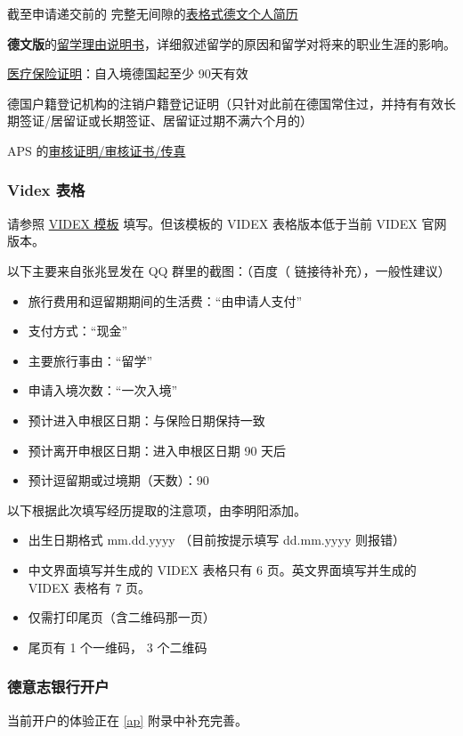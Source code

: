 \documentclass{article}
\begin{document}
\begin{enumerate}
\item 截至申请递交前的
完整无间隙的\underline{表格式德文个人简历}
\item \textbf{德文版}的\underline{留学理由说明书}，详细叙述留学的原因和留学对将来的职业生涯的影响。
\item \underline{医疗保险证明}：自入境德国起至少 90天有效
{\color{gray}\item 德国户籍登记机构的注销户籍登记证明（只针对此前在德国常住过，并持有有效长期签证/居留证或长期签证、居留证过期不满六个月的）}
\item APS 的\underline{审核证明/审核证书/传真}
\end{enumerate}

\subsubsection{Videx 表格}
请参照 \href{https://www.aps.org.cn/wp-content/uploads/Beispiel-Videx.pdf}{VIDEX 模板} 填写。但该模板的 VIDEX 表格版本低于当前 VIDEX 官网版本。

以下主要来自张兆昱发在 QQ 群里的截图：（百度（%
链接待补充），一般性建议）
\begin{itemize}
\item 旅行费用和逗留期期间的生活费：“由申请人支付”
\item 支付方式：“现金”
\item 主要旅行事由：“留学”
\item 申请入境次数：“一次入境”
\item 预计进入申根区日期：与保险日期保持一致
\item 预计离开申根区日期：进入申根区日期 90 天后
\item 预计逗留期或过境期（天数）：90
\end{itemize}
以下根据此次填写经历提取的注意项，由李明阳添加。
\begin{itemize}
  \item 出生日期格式 mm.dd.yyyy （目前按提示填写 dd.mm.yyyy 则报错）
  \item 中文界面填写并生成的 VIDEX 表格只有 6 页。英文界面填写并生成的 VIDEX 表格有 7 页。
  \item 仅需打印尾页（含二维码那一页）
  \item 尾页有 1 个一维码， 3 个二维码
\end{itemize}

\subsubsection[德意志银行开户]{德意志银行开户}
当前开户的体验正在 \ref{ap} 附录中补充完善。
\end{document}
